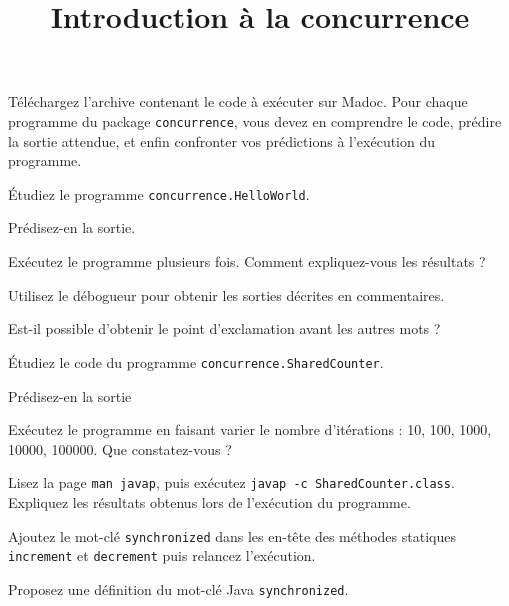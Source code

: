 \documentclass{td}
\title{Introduction à la concurrence}
\begin{document}
\maketitle

Téléchargez l'archive contenant le code à exécuter sur Madoc.
Pour chaque programme du package \linebreak\texttt{concurrence}, vous devez en comprendre le code,
prédire la sortie attendue, et enfin confronter vos prédictions
à l'exécution du programme.


\begin{exercice}[Asynchronie]

  Étudiez le programme \texttt{concurrence.HelloWorld}.

  \begin{question} 
  \item Prédisez-en la sortie.
  \item Exécutez le programme plusieurs fois. Comment expliquez-vous les résultats ?
  \item Utilisez le débogueur pour obtenir les sorties décrites en commentaires.
  \item Est-il possible d’obtenir le point d'exclamation avant les autres mots ?
  \end{question}
  
\end{exercice}


\begin{exercice}

  Étudiez le code du programme \texttt{concurrence.SharedCounter}.

  \begin{question} 
  \item Prédisez-en la sortie
  \item Exécutez le programme en faisant varier le nombre d'itérations :
    10, 100, 1000, 10000, 100000. Que constatez-vous ?
  \item Lisez la page \texttt{man javap}, puis exécutez
    \texttt{javap -c SharedCounter.class}. Expliquez les résultats
    obtenus lors de l'exécution du programme.
  \item Ajoutez le mot-clé \lstinline{synchronized} dans les en-tête des méthodes statiques \lstinline{increment} et \lstinline{decrement} puis relancez l'exécution.
  \item Proposez une définition du mot-clé Java \lstinline{synchronized}.
  \end{question}

\end{exercice}
\end{document}
